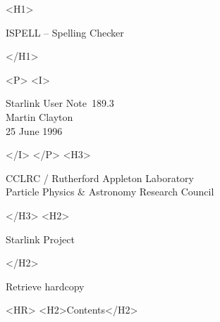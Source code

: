 \documentclass[twoside,11pt]{article}
\newcommand{\stardoccategory}  {Starlink User Note}
\newcommand{\stardocsource}    {sun\stardocnumber}
\newcommand{\stardocnumber}    {189.3}
\newcommand{\stardocauthors}   {Martin Clayton}
\newcommand{\stardocdate}      {25 June 1996}
\newcommand{\stardoctitle}     {ISPELL \sunspec{--}{-} Spelling Checker}
\newcommand{\htmladdnormallink}[2]{#1}
\newcommand{\htmladdimg}[1]{}
\newcommand{\htmlref}[2]{#1}
\newcommand{\htmladdtonavigation}[1]{}
\newcommand{\xlabel}[1]{}
\newcommand{\sunspec}[2]{#1}
\newcommand{\sunspec}[2]{#2}
\begin{document}
\begin{htmlonly}
   \xlabel{}
   \begin{rawhtml} <H1> \end{rawhtml}
      \stardoctitle
   \begin{rawhtml} </H1> \end{rawhtml}

   \begin{figure}[h]
   \epsfysize=100mm
   \end{figure}

   \begin{rawhtml} <P> <I> \end{rawhtml}
   \stardoccategory\ \stardocnumber \\
   \stardocauthors \\
   \stardocdate
   \begin{rawhtml} </I> </P> <H3> \end{rawhtml}
      \htmladdnormallink{CCLRC}{http://www.cclrc.ac.uk} /
      \htmladdnormallink{Rutherford Appleton Laboratory}
                        {http://www.cclrc.ac.uk/ral} \\
      \htmladdnormallink{Particle Physics \& Astronomy Research Council}
                        {http://www.pparc.ac.uk} \\
   \begin{rawhtml} </H3> <H2> \end{rawhtml}
      \htmladdnormallink{Starlink Project}{http://star-www.rl.ac.uk/}
   \begin{rawhtml} </H2> \end{rawhtml}
   \htmladdnormallink{\htmladdimg{source.gif} Retrieve hardcopy}
      {http://star-www.rl.ac.uk/cgi-bin/hcserver?\stardocsource}\\

  \label{stardoccontents}
  \begin{rawhtml} 
    <HR>
    <H2>Contents</H2>
  \end{rawhtml}
  \htmladdtonavigation{\htmlref{\htmladdimg{contents_motif.gif}}
        {stardoccontents}}

\end{htmlonly}
\end{document}
